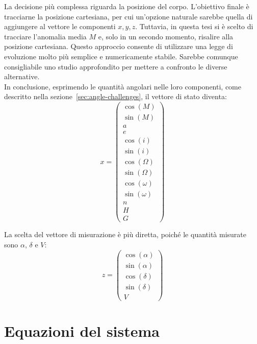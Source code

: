 \documentclass[12pt,a4paper,openright,twoside]{book}
\begin{document}
La decisione più complessa riguarda la posizione del corpo. L'obiettivo finale è tracciarne la posizione cartesiana, per cui un'opzione naturale sarebbe quella di aggiungere al vettore le componenti $x,y,z$. Tuttavia, in questa tesi si è scelto di tracciare l'anomalia media $M$ e, solo in un secondo momento, risalire alla posizione cartesiana. Questo approccio consente di utilizzare una legge di evoluzione molto più semplice e numericamente stabile. Sarebbe comunque consigliabile uno studio approfondito per mettere a confronto le diverse alternative. \\

In conclusione, esprimendo le quantità angolari nelle loro componenti, come descritto nella sezione~\ref{sec:angle-challenges}, il vettore di stato diventa:
\begin{equation}
x=\left(\begin{smallmatrix}
\cos(M) \\
\sin(M) \\
a \\
e \\
\cos(i) \\
\sin(i) \\
\cos(\Omega) \\
\sin(\Omega) \\
\cos(\omega) \\
\sin(\omega) \\
n \\
H \\
G
\end{smallmatrix}\right)
\end{equation} \pagebreak

La scelta del vettore di misurazione è più diretta, poiché le quantità misurate sono $\alpha$, $\delta$ e $V$:
\begin{equation}
z=\left(\begin{smallmatrix}
\cos(\alpha) \\
\sin(\alpha) \\
\cos(\delta) \\
\sin(\delta) \\
V
\end{smallmatrix}\right)
\end{equation}

\section{Equazioni del sistema}\label{sec:real-system-eqs}
\end{document}
